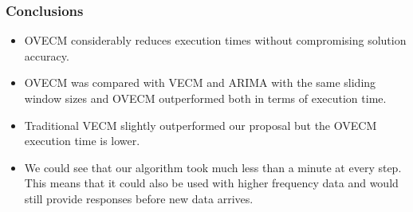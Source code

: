\documentclass{beamer}
\begin{document}

\begin{frame}
\frametitle{Conclusions}
\begin{itemize}
\item  OVECM considerably reduces execution times
without compromising solution accuracy.  
\item OVECM was compared with VECM and ARIMA
with the same sliding window sizes and OVECM outperformed both in terms of
execution time. 
\item Traditional VECM slightly outperformed our proposal but the
OVECM execution time is lower.
\item We could see that our algorithm took much less than a minute at every
step. This means that it could also be used with higher frequency data and would
still provide responses before new data arrives.  
\end{itemize}
\end{frame}
\end{document}

